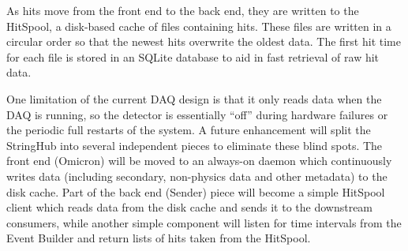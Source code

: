 




As hits move from the front end to the back end, they are written to the
HitSpool, a disk-based cache of files containing hits.  These files are
written in a circular order so that the newest hits overwrite the oldest data.
The first hit time for each file is stored in an SQLite database to aid in fast
retrieval of raw hit data.

One limitation of the current DAQ design is that it only reads data when the
DAQ is running, so the detector is essentially ``off'' during hardware failures
or the periodic full restarts of the system.  A future enhancement will split
the StringHub into several independent pieces to eliminate these blind spots.
The front end (Omicron) will be moved to an always-on daemon which
continuously writes data (including secondary, non-physics data and other
metadata) to the disk cache.  Part of the back end (Sender) piece will become a
simple HitSpool client which reads data from the disk cache and sends it to
the downstream consumers, while another simple component will listen for time
intervals from the Event Builder and return lists of hits taken from the
HitSpool.

